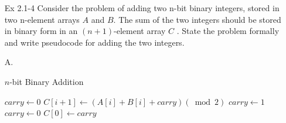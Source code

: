 \documentclass[fontsize=12pt,paper=a4]{book}
\newcommand{\To}{\ \textbf{to}\ }
\begin{document}
\begin{enumerate}
	\item[Ex 2.1-4]
		Consider the problem of adding two n-bit binary integers, stored in two n-element arrays $A$ and $B$. The sum of the two integers should be stored in binary form in an $(n + 1)$-element array $C$ . State the problem formally and write pseudocode for
adding the two integers.
	\item[A.]
		\begin{algorithm}
			\caption{$n$-bit Binary Addition}
			\begin{algorithmic}[1]
					\State $carry \gets 0$
					\For{$i \gets n-1 \To 0$}
						\State $C[i+1] \gets (A[i] + B[i]+carry) (\bmod 2)$
							\State $carry \gets 1$
						\Else
							\State $carry \gets 0$
						\EndIf
					\EndFor
					\State $C[0] \gets carry$
				\EndProcedure
			\end{algorithmic}
		\end{algorithm}
\end{enumerate}
\end{document}
